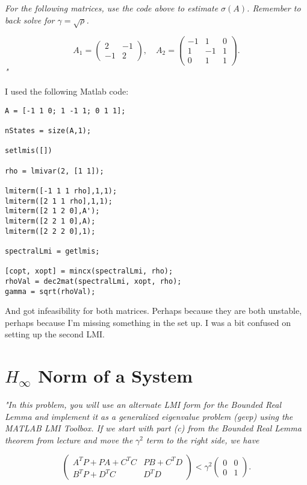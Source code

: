 \documentclass[12pt, letterpaper]{article}
\begin{document}
\textit{
For the following matrices, use the code above to estimate $\sigma(A)$. Remember to back solve for $\gamma = \sqrt{\rho}$.
}

\[
A_1 = \begin{pmatrix}
2 & -1 \\
-1 & 2
\end{pmatrix}, \quad
A_2 = \begin{pmatrix}
-1 & 1 & 0 \\
1 & -1 & 1 \\
0 & 1 & 1
\end{pmatrix}.
\] \textit{"}

I used the following Matlab code:

\begin{lstlisting}[style=matlabstyle]
% A = [2 -1; -1 2];
A = [-1 1 0; 1 -1 1; 0 1 1];

nStates = size(A,1);

setlmis([])

rho = lmivar(2, [1 1]);

lmiterm([-1 1 1 rho],1,1);
lmiterm([2 1 1 rho],1,1);
lmiterm([2 1 2 0],A');
lmiterm([2 2 1 0],A);
lmiterm([2 2 2 0],1);

spectralLmi = getlmis;

[copt, xopt] = mincx(spectralLmi, rho);
rhoVal = dec2mat(spectralLmi, xopt, rho);
gamma = sqrt(rhoVal);
\end{lstlisting}

And got infeasibility for both matrices. Perhaps because they are both unstable, perhaps because I'm missing something in the set up.
I was a bit confused on setting up the second LMI.

\section{$H_\infty$ Norm of a System}

\textit{"In this problem, you will use an alternate LMI form for the Bounded Real Lemma and implement it as a generalized eigenvalue problem (gevp) using the MATLAB LMI Toolbox. If we start with part (c) from the Bounded Real Lemma theorem from lecture and move the }$\gamma^2$\textit{ term to the right side, we have}

\[
\begin{pmatrix}
A^T P + PA + C^T C & PB + C^T D \\
B^T P + D^T C & D^T D
\end{pmatrix}
<
\gamma^2
\begin{pmatrix}
0 & 0 \\
0 & 1
\end{pmatrix}.
\]
\end{document}
